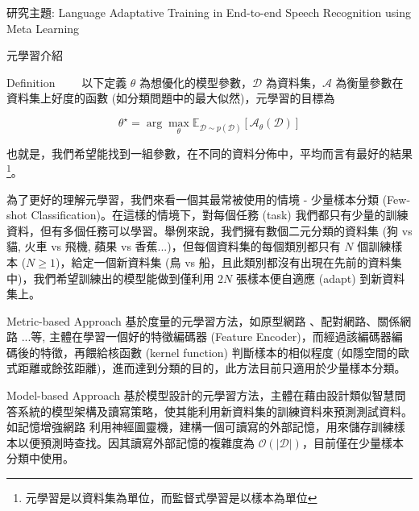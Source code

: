 \documentclass[12pt,UTF8,fntef]{article}
\begin{document}
\begin{section}{研究主題: Language Adaptative Training in End-to-end Speech Recognition using Meta Learning}
\begin{subsection}{元學習介紹}
    \begin{subsubsection}{Definition}
      ~~~~以下定義 $\theta$ 為想優化的模型參數，$\mathcal{D}$ 為資料集，$\mathcal{A}$ 為衡量參數在資料集上好度的函數 (如分類問題中的最大似然)，元學習的目標為

      \begin{equation}
        \theta^{\star} = \arg \max_\theta \mathbb{E}_{\mathcal{D} \sim p(\mathcal{D}) }[\mathcal{A}_\theta(\mathcal{D})]
      \end{equation}

      也就是，我們希望能找到一組參數，在不同的資料分佈中，平均而言有最好的結果\footnote{元學習是以資料集為單位，而監督式學習是以樣本為單位}。

      為了更好的理解元學習，我們來看一個其最常被使用的情境 - 少量樣本分類 (Few-shot Classification)。在這樣的情境下，對每個任務 (task) 我們都只有少量的訓練資料，但有多個任務可以學習。舉例來說，我們擁有數個二元分類的資料集 (狗 vs 貓, 火車 vs 飛機, 蘋果 vs 香蕉...)，但每個資料集的每個類別都只有 $N$ 個訓練樣本 ($N \geq 1$)，給定一個新資料集 (鳥 vs 船，且此類別都沒有出現在先前的資料集中)，我們希望訓練出的模型能做到僅利用 $2N$ 張樣本便自適應 (adapt) 到新資料集上。


    \end{subsubsection}

    \begin{subsubsection}{Metric-based Approach}
基於度量的元學習方法，如原型網路 \cite{snell2017prototypical}、配對網路\cite{vinyals2016matching}、關係網路 \cite{sung2018learning}...等, 主體在學習一個好的特徵編碼器 (Feature Encoder)，而經過該編碼器編碼後的特徵，再餵給核函數 (kernel function) 判斷樣本的相似程度 (如隱空間的歐式距離或餘弦距離)，進而達到分類的目的，此方法目前只適用於少量樣本分類。
    \end{subsubsection}

    \begin{subsubsection}{Model-based Approach}
基於模型設計的元學習方法，主體在藉由設計類似智慧問答系統的模型架構及讀寫策略，使其能利用新資料集的訓練資料來預測測試資料。如記憶增強網路 \cite{santoro2016meta}利用神經圖靈機，建構一個可讀寫的外部記憶，用來儲存訓練樣本以便預測時查找。因其讀寫外部記憶的複雜度為 $\mathcal{O}(|\mathcal{D}|)$，目前僅在少量樣本分類中使用。
    \end{subsubsection}


\end{subsection}
\end{section}
\end{document}

